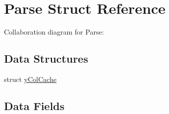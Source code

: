 \hypertarget{struct_parse}{}\section{Parse Struct Reference}
\label{struct_parse}


Collaboration diagram for Parse\+:
\subsection*{Data Structures}
\begin{DoxyCompactItemize}
\item 
struct \hyperlink{struct_parse_1_1y_col_cache}{y\+Col\+Cache}
\end{DoxyCompactItemize}
\subsection*{Data Fields}
